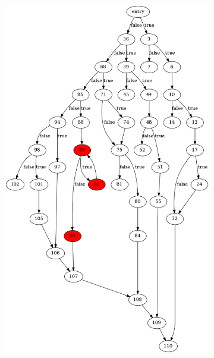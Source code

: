 \begin{figure}[htbp]
	\centering
	\begin{subfigure}[ht]{0.45\textwidth}
		\includegraphics[width=\textwidth]{inc/appendices/control_flow_analysis_example/step1_before.png}
	\end{subfigure}
	\qquad
	\begin{subfigure}[ht]{0.45\textwidth}

\end{subfigure}
\end{figure}
